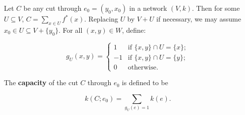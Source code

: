 Let $C$ be any cut through $e_0 = (y_0, x_0)$ in a network $(V, k)$. Then for some $U \subseteq V$, $C = \sum_{x \in U} f^*(x)$. Replacing $U$ by $V + U$ if necessary, we may assume $x_0 \in U \subseteq V + \{y_0\}$. For all $(x, y) \in W$, define:

$$g_U(x, y) = \begin{cases}
1 & \text{if } \{x, y\} \cap U = \{x\}; \\
-1 & \text{if } \{x, y\} \cap U = \{y\}; \\
0 & \text{otherwise.}
\end{cases}$$

The \textbf{capacity} of the cut $C$ through $e_0$ is defined to be

$$k(C; e_0) = \sum_{g_U(e) = 1} k(e).$$
